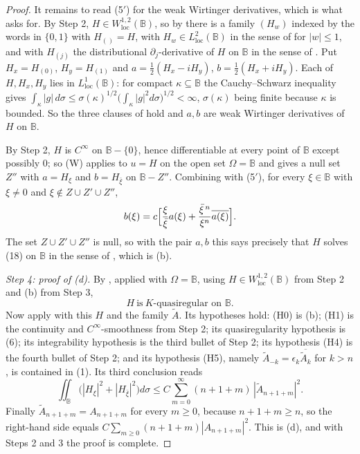 \begin{proof}
It remains to read (5$'$) for the weak Wirtinger derivatives, which is what
 asks for.  By Step 2, $H\in W^{1,2}_{\mathrm{loc}}(\mathbb{B})$,
so by  there is a family $(H_w)$ indexed by the words in
$\{0,1\}$ with $H_{()}=H$, with $H_w\in L^2_{\mathrm{loc}}(\mathbb{B})$ in the
sense of  for $|w|\le1$, and with $H_{(j)}$ the
distributional $\partial_j$-derivative of $H$ on $\mathbb{B}$ in the sense of
.  Put $H_x=H_{(0)}$, $H_y=H_{(1)}$ and
$a=\tfrac12(H_x-iH_y)$, $b=\tfrac12(H_x+iH_y)$.  Each of $H,H_x,H_y$ lies in
$L^1_{\mathrm{loc}}(\mathbb{B})$: for compact $\kappa\subseteq\mathbb{B}$ the
Cauchy--Schwarz inequality gives
$\int_\kappa|g|\,d\sigma\le\sigma(\kappa)^{1/2}
\bigl(\int_\kappa|g|^2d\sigma\bigr)^{1/2}<\infty$, $\sigma(\kappa)$ being
finite because $\kappa$ is bounded.  So the three clauses of
 hold and $a,b$ are weak Wirtinger derivatives of
$H$ on $\mathbb{B}$.

By Step 2, $H$ is $C^\infty$ on $\mathbb{B}-\{0\}$, hence differentiable at
every point of $\mathbb{B}$ except possibly $0$; so (W) applies to $u=H$ on
the open set $\Omega=\mathbb{B}$ and gives a null set $Z''$ with $a=H_\xi$ and
$b=H_{\bar\xi}$ on $\mathbb{B}-Z''$.  Combining with (5$'$), for every
$\xi\in\mathbb{B}$ with $\xi\neq0$ and $\xi\notin Z\cup Z'\cup Z''$,
\[
  b(\xi)=c\Bigl[\frac{\xi}{\bar\xi}a(\xi)
    +\frac{\bar\xi^{\,n}}{\xi^{n}}\overline{a(\xi)}\Bigr].
\]
The set $Z\cup Z'\cup Z''$ is null, so with the pair $a,b$ this says precisely
that $H$ solves (18) on $\mathbb{B}$ in the sense of ,
which is (b).

\emph{Step 4: proof of (d).}  By , applied
with $\Omega=\mathbb{B}$, using $H\in W^{1,2}_{\mathrm{loc}}(\mathbb{B})$ from
Step 2 and (b) from Step 3,
\begin{equation}\tag{6}
  H\ \text{is}\ K\text{-quasiregular on }\mathbb{B}.
\end{equation}
Now apply  with this $H$ and the family
$\widetilde{A}$.  Its hypotheses hold: (H0) is (b); (H1) is the continuity and
$C^\infty$-smoothness from Step 2; its quasiregularity hypothesis is (6); its
integrability hypothesis is the third bullet of Step 2; its hypothesis (H4) is
the fourth bullet of Step 2; and its hypothesis (H5), namely
$\widetilde{A}_{-k}=\epsilon_k\overline{\widetilde{A}_k}$ for $k>n$, is
contained in (1).  Its third conclusion reads
\[
  \iint_{\mathbb{B}}\bigl(|H_\xi|^2+|H_{\bar\xi}|^2\bigr)d\sigma
  \le C\sum_{m=0}^{\infty}(n+1+m)\,|\widetilde{A}_{n+1+m}|^2 .
\]
Finally $\widetilde{A}_{n+1+m}=A_{n+1+m}$ for every $m\ge0$, because
$n+1+m\ge n$, so the right-hand side equals
$C\sum_{m\ge0}(n+1+m)|A_{n+1+m}|^2$.  This is (d), and with Steps 2 and 3 the
proof is complete.
\end{proof}
